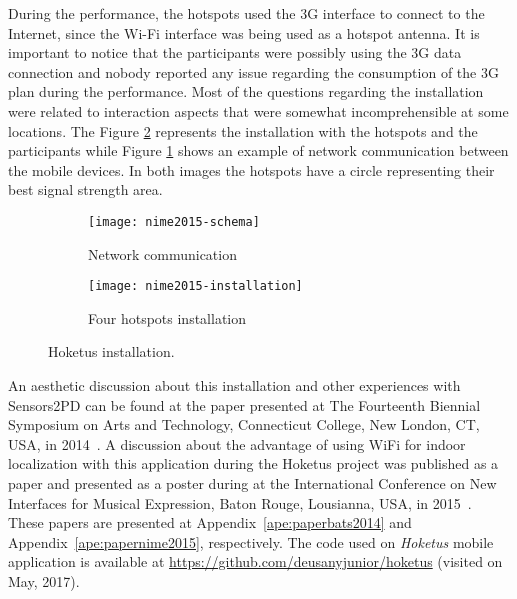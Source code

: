 During the performance, the hotspots used the 3G interface to connect to the Internet, since the Wi-Fi interface was being used as a hotspot antenna. 
It is important to notice that the participants were possibly using the 3G data connection and nobody reported any issue regarding the consumption of the 3G plan during the performance.
Most of the questions regarding the installation were related to interaction aspects that were somewhat incomprehensible at some locations.
The Figure \ref{fig:installation} represents the installation with the hotspots and the participants while Figure \ref{fig:installation-schema} shows an example of network communication between the mobile devices. 
In both images the hotspots have a circle representing their best signal strength area.

\begin{figure*}[!ht]
\centering
\begin{subfigure}{.45\textwidth}
	\texttt{[image: nime2015-schema]}
    \caption{Network communication}
	\label{fig:installation-schema}
\end{subfigure}
\begin{subfigure}{.45\textwidth}
	\texttt{[image: nime2015-installation]}
	\caption{Four hotspots installation}
	\label{fig:installation}
\end{subfigure}

\caption{Hoketus installation.}
\label{fig:hoketusinstallation}
\end{figure*}

An aesthetic discussion about this installation and other experiences with Sensors2PD can be found at the paper presented at The Fourteenth Biennial Symposium on Arts and Technology, Connecticut College, New London, CT, USA, in 2014~\citep{Bandeira2014notes}.
A discussion about the advantage of using WiFi for indoor localization with this application during the Hoketus project was published as a paper and presented as a poster during at the International Conference on New Interfaces for Musical Expression, Baton Rouge, Lousianna, USA, in 2015~\citep{deCarvalhoJunior2015indoor}.
These papers are presented at Appendix~\ref{ape:paperbats2014} and Appendix~\ref{ape:papernime2015}, respectively.
The code used on \textit{Hoketus} mobile application is available at \url{https://github.com/deusanyjunior/hoketus} (visited on May, 2017).

